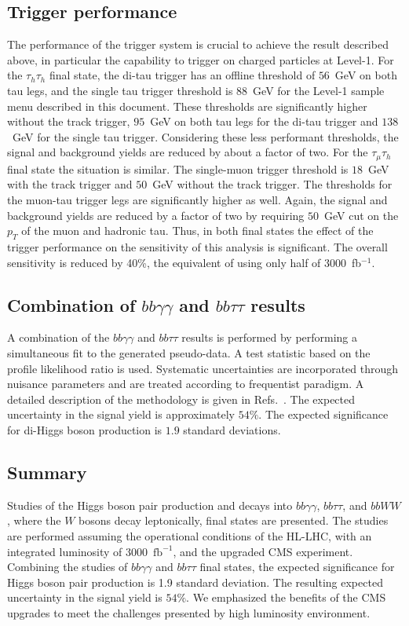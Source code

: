 \subsection{Trigger performance}
The performance of the trigger system is crucial to achieve the result
described above, in particular the capability to trigger on charged
particles at Level-1. For the $\tau_{h}\tau_{h}$ final state, the
di-tau trigger has an offline threshold of $56$~GeV on both tau legs,
and the single tau trigger threshold is $88$~GeV for the Level-1 sample menu
described in this document. These thresholds are significantly higher
without the track trigger, $95$~GeV on both tau legs for the di-tau
trigger and $138$~GeV for the single tau trigger. Considering these less
performant thresholds, the signal and background yields are reduced by about a factor of
two. For the $\tau_{\mu}\tau_{h}$ final state the situation is similar. The single-muon trigger
threshold is $18$~GeV with the track trigger and $50$~GeV without the track
trigger. The thresholds for the muon-tau trigger legs are significantly
higher as well. Again, the signal and background yields are reduced by a factor of two
by requiring $50$~GeV cut on the $p_T$ of the muon and hadronic tau.
Thus, in both final states the effect of the trigger performance on the sensitivity of this analysis is significant. The overall sensitivity is
reduced by 40\%, the equivalent of  using only half of 3000~fb$^{-1}$.

\subsection{Combination of $bb\gamma\gamma$ and $bb\tau\tau$ results}
A combination of the  $bb\gamma\gamma$ and $bb\tau\tau$ results is performed by performing a simultaneous fit to the generated pseudo-data. A test statistic based on the profile likelihood ratio is used. Systematic uncertainties are incorporated through nuisance parameters and are treated according to frequentist paradigm. A detailed description of the methodology is given in Refs.~\cite{CMS-NOTE-2011-005,Chatrchyan201226}. The expected uncertainty in the signal yield is approximately $54\%$. The expected significance for di-Higgs boson production is $1.9$ standard deviations.  

\subsection{Summary}
\label{sec:conclusion}
Studies  of the Higgs boson pair production and decays into $bb\gamma\gamma$, $bb\tau\tau$, and $bbWW$, where the $W$ bosons decay leptonically, final states are presented. The studies are performed assuming the operational conditions of the HL-LHC, with an integrated luminosity of 3000~$\mathrm{fb}^{-1}$, and the upgraded CMS experiment. Combining the studies of $bb\gamma\gamma$ and $bb\tau\tau$ final states, the expected significance for Higgs boson pair production is 1.9 standard deviation. The resulting expected uncertainty in the signal yield is $54\%$. We emphasized the benefits of the CMS \phasetwo upgrades to meet the challenges presented by high luminosity environment. 


